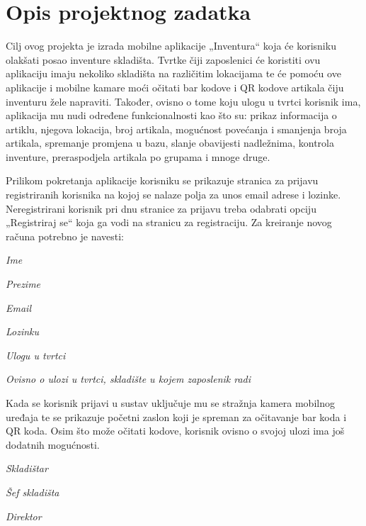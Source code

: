 \chapter{Opis projektnog zadatka}
		
		Cilj ovog projekta je izrada mobilne aplikacije „Inventura“ koja će korisniku olakšati posao inventure skladišta. Tvrtke čiji zaposlenici će koristiti ovu aplikaciju imaju nekoliko skladišta na različitim lokacijama te će pomoću ove aplikacije i mobilne kamare moći očitati bar kodove i QR kodove artikala čiju inventuru žele napraviti. Također, ovisno o tome koju ulogu u tvrtci korisnik ima, aplikacija mu nudi određene funkcionalnosti kao što su: prikaz informacija o artiklu, njegova lokacija, broj artikala, mogućnost povećanja i smanjenja broja artikala, spremanje promjena u bazu, slanje obavijesti nadležnima, kontrola inventure, preraspodjela artikala po grupama i mnoge druge.
		
		Prilikom pokretanja aplikacije korisniku se prikazuje stranica za prijavu registriranih korisnika na kojoj se nalaze polja za unos email adrese i lozinke. Neregistrirani korisnik pri dnu stranice za prijavu treba odabrati opciju „Registriraj se“ koja ga vodi na stranicu za registraciju. Za kreiranje novog računa potrebno je navesti:
		
		\begin{packed_item}
			\item \textit{Ime}
			\item \textit{Prezime}
			\item \textit{Email}
			\item \textit{Lozinku}
			\item \textit{Ulogu u tvrtci}
			\item \textit{Ovisno o ulozi u tvrtci, skladište u kojem zaposlenik radi}
		\end{packed_item}
	
		Kada se korisnik prijavi u sustav uključuje mu se stražnja kamera mobilnog uređaja te se prikazuje početni zaslon koji je spreman za očitavanje bar koda i QR koda. Osim što može očitati kodove, korisnik ovisno o svojoj ulozi ima još dodatnih mogućnosti.
		
		\begin{packed_item}
			\item \textit{Skladištar}
			\item \textit{Šef skladišta}
			\item \textit{Direktor}
		\end{packed_item}
	
